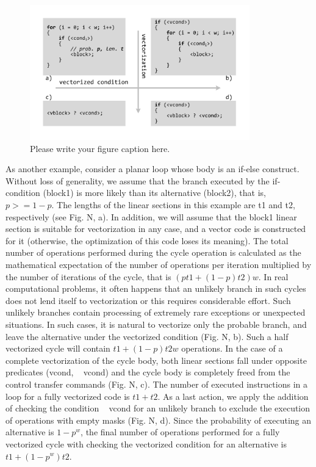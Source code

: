 \documentclass[
11pt,%
tightenlines,%
twoside,%
onecolumn,%
nofloats,%
nobibnotes,%
nofootinbib,%
superscriptaddress,%
noshowpacs,%
centertags]%
{revtex4}
\begin{document}
\begin{figure}[h]
\setcaptionmargin{5mm}
\onelinecaptionstrue  %
\includegraphics[width=0.85\textwidth]{pics/if_vectorization.pdf}
\caption{Please write your figure caption here.}\label{fig:1}
\end{figure}

As another example, consider a planar loop whose body is an if-else construct. Without loss of generality, we assume that the branch executed by the if-condition (block1) is more likely than its alternative (block2), that is, $p> = 1 - p$. The lengths of the linear sections in this example are t1 and t2, respectively (see Fig. N, a). In addition, we will assume that the block1 linear section is suitable for vectorization in any case, and a vector code is constructed for it (otherwise, the optimization of this code loses its meaning). The total number of operations performed during the cycle operation is calculated as the mathematical expectation of the number of operations per iteration multiplied by the number of iterations of the cycle, that is $(pt1 + (1 - p) t2) w$. In real computational problems, it often happens that an unlikely branch in such cycles does not lend itself to vectorization or this requires considerable effort. Such unlikely branches contain processing of extremely rare exceptions or unexpected situations. In such cases, it is natural to vectorize only the probable branch, and leave the alternative under the vectorized condition (Fig. N, b). Such a half vectorized cycle will contain $t1 + (1 - p) t2w$ operations. In the case of a complete vectorization of the cycle body, both linear sections fall under opposite predicates (vcond, ~ vcond) and the cycle body is completely freed from the control transfer commands (Fig. N, c). The number of executed instructions in a loop for a fully vectorized code is $t1 + t2$. As a last action, we apply the addition of checking the condition ~ vcond for an unlikely branch to exclude the execution of operations with empty masks (Fig. N, d). Since the probability of executing an alternative is $1 - p ^ w$, the final number of operations performed for a fully vectorized cycle with checking the vectorized condition for an alternative is $t1 + (1 - p ^ w) t2$.
\end{document}
